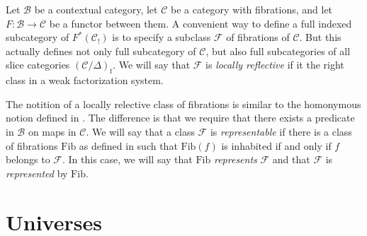 \documentclass[reqno]{amsart}
\theoremstyle{definition}
\theoremstyle{remark}
\newcommand{\fs}[1]{\mathrm{#1}}
\newcommand{\scat}[1]{\mathcal{#1}}
\newcommand{\Fib}{\mathcal{F}}
\numberwithin{figure}{section}
\begin{document}
Let $\scat{B}$ be a contextual category, let $\scat{C}$ be a category with fibrations, and let $F : \scat{B} \to \scat{C}$ be a functor between them.
A convenient way to define a full indexed subcategory of $F^*(\scat{C}_!)$ is to specify a subclass $\Fib$ of fibrations of $\scat{C}$.
But this actually defines not only full subcategory of $\scat{C}$, but also full subcategories of all slice categories $(\scat{C}/\Delta)_\fs{f}$.
We will say that $\Fib$ is \emph{locally reflective} if it the right class in a weak factorization system.

The notition of a locally relective class of fibrations is similar to the homonymous notion defined in \cite[Subsection~10.1]{indexed-tt}.
The difference is that we require that there exists a predicate in $\scat{B}$ on maps in $\scat{C}$.
We will say that a class $\Fib$ is \emph{representable} if there is a class of fibrations $\fs{Fib}$ as defined in \cite[Subsection~9.2]{indexed-tt} such that $\fs{Fib}(f)$ is inhabited if and only if $f$ belongs to $\Fib$.
In this case, we will say that $\fs{Fib}$ \emph{represents} $\Fib$ and that $\Fib$ is \emph{represented} by $\fs{Fib}$.


\section{Universes}




\end{document}
